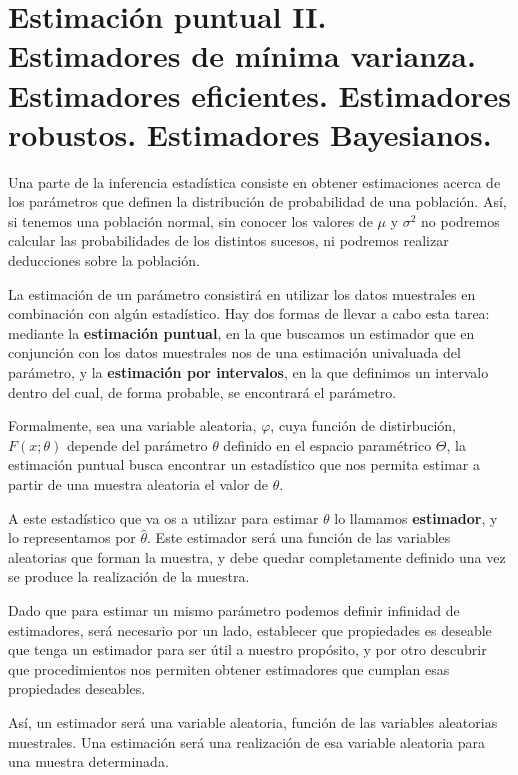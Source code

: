 \chapter[Estimaci\'on puntual II.]{Estimaci\'on puntual II. \\
\normalsize Estimadores de m\'inima varianza. Estimadores eficientes. Estimadores robustos. Estimadores Bayesianos.}


Una parte de la inferencia estad\'istica consiste en obtener estimaciones acerca de los par\'ametros que definen la distribuci\'on de probabilidad de una poblaci\'on. As\'i, si tenemos una poblaci\'on normal, sin conocer los valores de $\mu$ y $\sigma^2$ no podremos calcular las probabilidades de los distintos sucesos, ni podremos realizar deducciones sobre la poblaci\'on.

La estimaci\'on de un par\'ametro consistir\'a en utilizar los datos muestrales en combinaci\'on con alg\'un estad\'istico. Hay dos formas de llevar a cabo esta tarea: mediante la \textbf{estimaci\'on puntual}, en la que buscamos un estimador que en conjunci\'on con los datos muestrales nos de una estimaci\'on univaluada del par\'ametro, y la \textbf{estimaci\'on por intervalos}, en la que definimos un intervalo dentro del cual, de forma probable, se encontrar\'a el par\'ametro.

Formalmente, sea una variable aleatoria, $\varphi$, cuya funci\'on de distirbuci\'on, $F(x;\theta)$ depende del par\'ametro $\theta$ definido en el espacio param\'etrico $\Theta$, la estimaci\'on puntual busca encontrar un estad\'istico que nos permita estimar a partir de una muestra aleatoria el valor de $\theta$.

A este estad\'istico que va os a utilizar para estimar $\theta$ lo llamamos \textbf{estimador}, y lo representamos por $\hat{\theta}$. Este estimador ser\'a una funci\'on de las variables aleatorias que forman la muestra, y debe quedar completamente definido una vez se produce la realizaci\'on de la muestra.

Dado que para estimar un mismo par\'ametro podemos definir infinidad de estimadores, ser\'a necesario por un lado, establecer que propiedades es deseable que tenga un estimador para ser \'util a nuestro prop\'osito, y por otro descubrir que procedimientos nos permiten obtener estimadores que cumplan esas propiedades deseables.

As\'i, un estimador ser\'a una variable aleatoria, funci\'on de las variables aleatorias muestrales. Una estimaci\'on ser\'a una realizaci\'on de esa variable aleatoria para una muestra determinada.

